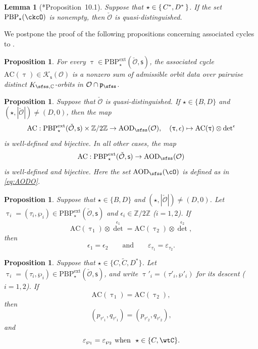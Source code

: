 \documentclass[11pt,a4paper]{amsart}
\newcommand{\CK}{{\mathcal {K}}}
\newcommand{\CO}{{\mathcal {O}}}
\newcommand{\p}{\mathfrak p}
\newcommand{\Z}{\mathbb{Z}}
\numberwithin{equation}{section}
\newtheorem{lem}[thm]{Lemma}
\newtheorem{prop}[thm]{Proposition}
\theoremstyle{remark}
\def\PBPe{\mathrm{PBP}^{\mathrm{ext}}}
\def\PBP{\mathrm{PBP}}
\begin{document}
\begin{lem}[{\cite{BMSZa}*{Proposition~10.1}}]\label{prop:CD*}
  Suppose that $\star\in \set{C^*, D^*}$. If the set $\PBP_\star(\ckcO)$ is nonempty, then $\check \CO$ is quasi-distinguished.
\end{lem}


We postpone the proof of the following propositions concerning associated cycles to  .

\begin{prop}\label{thmac1}
 For every $\uptau\in \PBPe_\star(\check \CO,\mathsf s)$, the associated cycle $\mathrm{AC}(\uptau)\in \CK_{\mathsf s}(\CO)$ is a nonzero  sum of  admissible orbit data
over pairwise distinct $K_{\sfss,\C}$-orbits in $\CO\cap \p_{\sfss}$.
\end{prop}

\begin{prop}\label{thmac3}
Suppose that  $\check \CO$ is quasi-distinguished.  If $\star\in \{B,D\}$ and $(\star, |\check \CO|)\neq (D, 0)$, then  the map
\[
\mathrm{AC}: \PBPe_\star(\check \CO,\mathsf s)\times \Z/2\Z \rightarrow  \mathrm{AOD}_{\sfss}(\CO),\quad (\uptau, \epsilon)\mapsto \mathrm{AC}(\uptau)\otimes {\det}^{\epsilon}
\]
is well-defined and bijective. In all other cases, the
map
\[
\mathrm{AC}: \PBPe_\star(\check \CO,\mathsf s)\rightarrow \mathrm{AOD}_{\sfss}(\CO)
\]
is well-defined and bijective.
Here the set $\mathrm{AOD}_{\sfss}(\cO)$ is defined as in
\eqref{eq:AODO}.
\end{prop}

\begin{prop}\label{thmac4}
Suppose that  $\star\in \{B,D\}$ and $(\star, |\check \CO|)\neq (D, 0)$. Let $\uptau_i=(\tau_i, \wp_i)\in \PBPe_\star(\check \CO,\mathsf s)$ and $\epsilon_i\in \Z/2\Z$ ($i=1,2$).   If
\[
  \mathrm{AC}(\uptau_1)\otimes {\det}^{\epsilon_1}= \mathrm{AC}(\uptau_2)\otimes {\det}^{\epsilon_2},
\]
then
\[
  \epsilon_1=\epsilon_2\qquad\textrm{and}\qquad \varepsilon_{\tau_1}=\varepsilon_{\tau_2}.
\]
 \end{prop}


\begin{prop}\label{thmac5}
Suppose that  $\star\in \{C,\widetilde C, D^*\}$. Let $\uptau_i=(\tau_i, \wp_i)\in \PBPe_\star(\check \CO,\mathsf s)$, and write $\uptau'_i=(\tau'_i, \wp'_i)$ for its descent ($i=1,2$).   If
\[
  \mathrm{AC}(\uptau_1)= \mathrm{AC}(\uptau_2),
\]
then
\[
 ( p_{\tau'_1}, q_{\tau'_1})=( p_{\tau'_2}, q_{\tau'_2}),
 \]
 and
 \[
  \varepsilon_{\wp_1}=\varepsilon_{\wp_2}\  \textrm{when $\ \star\in\{C,\wtC\}$}.
\]
 \end{prop}
\end{document}
